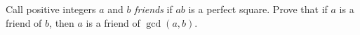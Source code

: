 Call positive integers $a$ and $b$ \emph{friends} if $ab$ is a perfect square. Prove that if $a$ is a friend of $b$, then $a$ is a friend of $\gcd(a,b)$.
